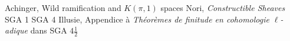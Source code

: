 \documentclass[deligne.tex]{subfiles}
\begin{document}
\begin{thebibliography}{Achinger}
 Achinger, Wild ramification and $K(\pi,1)$ spaces
 Nori, \emph{Constructible Sheaves}
 SGA 1
 SGA 4
 Illusie, Appendice à \textit{Théorèmes de finitude en cohomologie $\ell$-adique} dans SGA $4\frac12$


\end{thebibliography}
\end{document}
